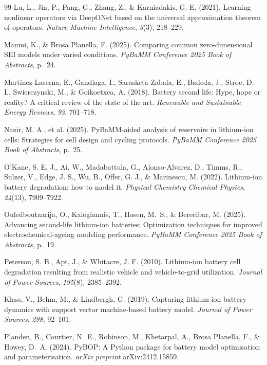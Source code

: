 \documentclass[preprint,12pt,3p,authoryear]{elsarticle}
\begin{document}
\begin{thebibliography}{99}
Lu, L., Jin, P., Pang, G., Zhang, Z., \& Karniadakis, G. E. (2021).
Learning nonlinear operators via DeepONet based on the universal
approximation theorem of operators. \emph{Nature Machine
Intelligence}, \emph{3}(3), 218--229.

Manmi, K., \& Brosa Planella, F. (2025). Comparing common zero-dimensional
SEI models under varied conditions. \emph{PyBaMM Conference 2025 Book
of Abstracts}, p.~24.

Mart\'{i}nez-Laserna, E., Gandiaga, I., Sarasketa-Zabala, E.,
Badeda, J., Stroe, D.-I., Swierczynski, M., \& Goikoetxea, A. (2018).
Battery second life: Hype, hope or reality? A critical review of the
state of the art. \emph{Renewable and Sustainable Energy Reviews},
\emph{93}, 701--718.

Nazir, M. A., et al. (2025). PyBaMM-aided analysis of reservoirs in
lithium-ion cells: Strategies for cell design and cycling protocols.
\emph{PyBaMM Conference 2025 Book of Abstracts}, p.~25.

O'Kane, S. E. J., Ai, W., Madabattula, G., Alonso-Alvarez, D., Timms, R.,
Sulzer, V., Edge, J. S., Wu, B., Offer, G. J., \& Marinescu, M. (2022).
Lithium-ion battery degradation: how to model it. \emph{Physical
Chemistry Chemical Physics}, \emph{24}(13), 7909--7922.

Ouledboutaarija, O., Kalogiannis, T., Hosen, M.~S., \& Berecibar, M.
(2025). Advancing second-life lithium-ion batteries: Optimization
techniques for improved electrochemical-ageing modeling performance.
\emph{PyBaMM Conference 2025 Book of Abstracts}, p.~19.

Peterson, S. B., Apt, J., \& Whitacre, J. F. (2010). Lithium-ion
battery cell degradation resulting from realistic vehicle and
vehicle-to-grid utilization. \emph{Journal of Power Sources},
\emph{195}(8), 2385--2392.

Klass, V., Behm, M., \& Lindbergh, G. (2019). Capturing lithium-ion
battery dynamics with support vector machine-based battery model.
\emph{Journal of Power Sources}, \emph{298}, 92--101.

Planden, B., Courtier, N.~E., Robinson, M., Khetarpal, A., Brosa
Planella, F., \& Howey, D.~A. (2024). PyBOP: A Python package for
battery model optimisation and parameterisation. \emph{arXiv preprint}
arXiv:2412.15859.


\end{thebibliography}
\end{document}
